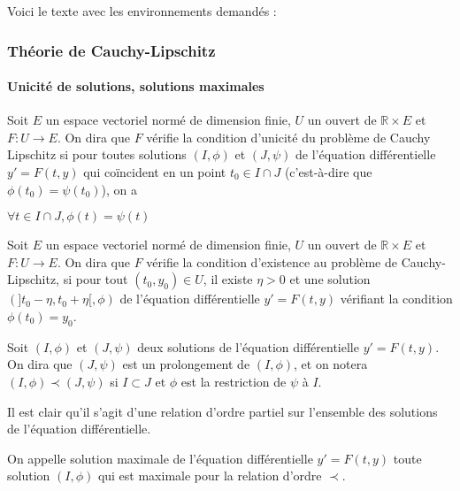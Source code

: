 Voici le texte avec les environnements demandés :

\subsubsection{Théorie de Cauchy-Lipschitz}

\paragraph{Unicité de solutions, solutions maximales}

\begin{de}
Soit $E$ un espace vectoriel normé de dimension finie, $U$
un ouvert de $\mathbb{R} \times E$ et $F : U \rightarrow E$. On dira que $F$ vérifie la condition
d'unicité du problème de Cauchy Lipschitz si pour toutes solutions $(I,\phi)$
et $(J,\psi)$ de l'équation différentielle $y' = F(t,y)$ qui coïncident en un
point $t_0 \in I \cap J$ (c'est-à-dire que $\phi(t_0) =
\psi(t_0)$), on a

$\forall t \in I \cap J, \phi(t) = \psi(t)$
\end{de}

\begin{de}
Soit $E$ un espace vectoriel normé de dimension finie, $U$
un ouvert de $\mathbb{R} \times E$ et $F : U \rightarrow E$. On dira que $F$ vérifie la condition
d'existence au problème de Cauchy-Lipschitz, si pour tout
$(t_0,y_0) \in U$, il existe $\eta > 0$ et une
solution $(]t_0 - \eta,t_0 + \eta[,\phi)$ de l'équation
différentielle $y' = F(t,y)$ vérifiant la condition $\phi(t_0) =
y_0$.
\end{de}

\begin{de}
Soit $(I,\phi)$ et $(J,\psi)$ deux solutions de l'équation
différentielle $y' = F(t,y)$. On dira que $(J,\psi)$ est un prolongement de
$(I,\phi)$, et on notera $(I,\phi) \prec (J,\psi)$ si $I \subset J$ et $\phi$ est la restriction de $\psi$
à $I$.
\end{de}

\begin{rem}
Il est clair qu'il s'agit d'une relation d'ordre partiel
sur l'ensemble des solutions de l'équation différentielle.
\end{rem}

\begin{de} 
On appelle solution maximale de l'équation
différentielle $y' = F(t,y)$ toute solution $(I,\phi)$ qui est maximale pour la
relation d'ordre $\prec$.
\end{de}

